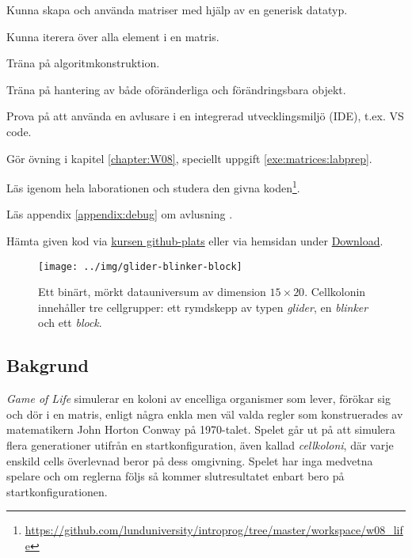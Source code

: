 
\Lab{\LabWeekEIGHT}

\begin{Goals}
\item Kunna skapa och använda matriser med hjälp av en generisk datatyp.
\item Kunna iterera över alla element i en matris.
\item Träna på algoritmkonstruktion.
\item Träna på hantering av både oföränderliga och förändringsbara objekt.
\item Prova på att använda en avlusare  i en integrerad utvecklingsmiljö (IDE), t.ex. VS code.
\end{Goals}

\begin{Preparations}
\item Gör övning {\tt \ExeWeekEIGHT} i kapitel \ref{chapter:W08}, speciellt uppgift \ref{exe:matrices:labprep}.

\item Läs igenom hela laborationen och studera den givna koden\footnote{\url{https://github.com/lunduniversity/introprog/tree/master/workspace/w08_life}}.
\item Läs appendix \ref{appendix:debug} om avlusning .
\item Hämta given kod via \href{https://github.com/lunduniversity/introprog/tree/master/workspace/}{kursen github-plats} eller via hemsidan under \href{https://cs.lth.se/pgk/download/}{Download}.

\end{Preparations}


\begin{figure}[H]
  \texttt{[image: ../img/glider-blinker-block]}

  \vspace{-2em}\caption{\label{lab:life:glider-blinker-block}Ett binärt, mörkt datauniversum av dimension $15  \times 20$. Cellkolonin innehåller tre cellgrupper: ett rymdskepp av typen \emph{glider}, en \emph{blinker} och ett \emph{block}.}
\end{figure}


\subsection{Bakgrund}

\emph{Game of Life} simulerar en koloni av encelliga organismer som lever, förökar sig och dör i en matris, enligt några enkla men väl valda regler som konstruerades av matematikern John Horton Conway på 1970-talet. Spelet går ut på att simulera flera generationer utifrån en startkonfiguration, även kallad \emph{cellkoloni}, där varje enskild cells överlevnad beror på dess omgivning. Spelet har inga medvetna spelare och om reglerna följs så kommer slutresultatet enbart bero på startkonfigurationen.

